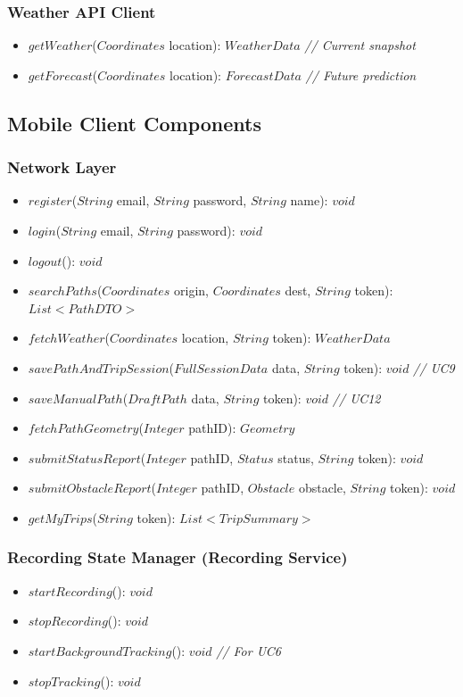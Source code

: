 \subsubsection*{Weather API Client}
\begin{itemize}
    \item $getWeather$($Coordinates$ location): $WeatherData$ \textit{// Current snapshot}
    \item $getForecast$($Coordinates$ location): $ForecastData$ \textit{// Future prediction}
\end{itemize}

\subsection{Mobile Client Components}

\subsubsection*{Network Layer}
\begin{itemize}
    \item $register$($String$ email, $String$ password, $String$ name): $void$
    \item $login$($String$ email, $String$ password): $void$
    \item $logout$(): $void$
    \item $searchPaths$($Coordinates$ origin, $Coordinates$ dest, $String$ token): $List<PathDTO>$
    \item $fetchWeather$($Coordinates$ location, $String$ token): $WeatherData$
    \item $savePathAndTripSession$($FullSessionData$ data, $String$ token): $void$ \textit{// UC9}
    \item $saveManualPath$($DraftPath$ data, $String$ token): $void$ \textit{// UC12}
    \item $fetchPathGeometry$($Integer$ pathID): $Geometry$
    \item $submitStatusReport$($Integer$ pathID, $Status$ status, $String$ token): $void$
    \item $submitObstacleReport$($Integer$ pathID, $Obstacle$ obstacle, $String$ token): $void$
    \item $getMyTrips$($String$ token): $List<TripSummary>$
\end{itemize}

\subsubsection*{Recording State Manager (Recording Service)}
\begin{itemize}
    \item $startRecording$(): $void$
    \item $stopRecording$(): $void$
    \item $startBackgroundTracking$(): $void$ \textit{// For UC6}
    \item $stopTracking$(): $void$
\end{itemize}

